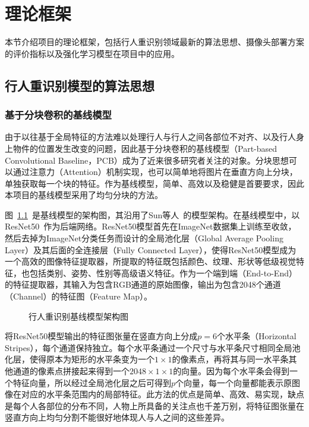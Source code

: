 \chapter{理论框架}\label{sec:theory}

本节介绍项目的理论框架，包括行人重识别领域最新的算法思想、摄像头部署方案的评价指标以及强化学习模型在项目中的应用。

\section{行人重识别模型的算法思想}

\subsection{基于分块卷积的基线模型}

由于以往基于全局特征的方法难以处理行人与行人之间各部位不对齐、以及行人身上物件的位置发生改变的问题，因此基于分块卷积的基线模型（Part-based Convolutional Baseline，PCB）成为了近来很多研究者关注的对象。分块思想可以通过注意力（Attention）机制实现，也可以简单地将图片在垂直方向上分块，单独获取每一个块的特征。作为基线模型，简单、高效以及稳健是首要要求，因此本项目的基线模型采用了均匀分块的方法。

图~\ref{fig:baseline}~是基线模型的架构图，其沿用了Sun等人~\cite{sun2017beyond}的模型架构。在基线模型中，以ResNet50~\cite{he2016deep}作为后端网络。ResNet50模型首先在ImageNet数据集上训练至收敛，然后去掉为ImageNet分类任务而设计的全局池化层（Global Average Pooling Layer）及其后面的全连接层（Fully Connected Layer），使得ResNet50模型成为一个高效的图像特征提取器，所提取的特征既包括颜色、纹理、形状等低级视觉特征，也包括类别、姿势、性别等高级语义特征。作为一个端到端（End-to-End）的特征提取器，其输入为包含RGB通道的原始图像，输出为包含2048个通道（Channel）的特征图（Feature Map）。

\begin{figure}[!htb]
\centering
\figarchpcb
\caption{行人重识别基线模型架构图}
\label{fig:baseline}
\end{figure}

将ResNet50模型输出的特征图张量在竖直方向上分成$p=6$个水平条（Horizontal Stripes），每个通道保持独立。每个水平条通过一个尺寸与水平条尺寸相同全局池化层，使得原本为矩形的水平条变为一个$1\times1$的像素点，再将其与同一水平条其他通道的像素点拼接起来得到一个$2048\times1\times1$的向量。因为每个水平条会得到一个特征向量，所以经过全局池化层之后可得到$p$个向量，每一个向量都能表示原图像在对应的水平条范围内的局部特征。此方法的优点是简单、高效、易实现，缺点是每个人各部位的分布不同，人物上所具备的关注点也千差万别，将特征图张量在竖直方向上均匀分割不能很好地体现人与人之间的这些差异。

